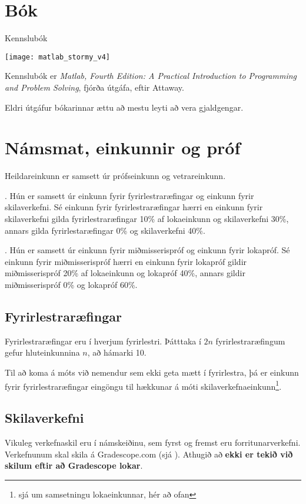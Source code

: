 \documentclass[justified, nobib]{tufte-handout}
\begin{document}
\section{Bók}
\begin{marginfigure}
    \caption{Kennslubók}
    \begin{center}
    \texttt{[image: matlab\_stormy\_v4]}
    \end{center}
\end{marginfigure}
Kennslubók er \emph{Matlab, Fourth Edition: A Practical Introduction to Programming and Problem Solving}, fjórða útgáfa, eftir Attaway.

Eldri útgáfur bókarinnar ættu að mestu leyti að vera gjaldgengar.

\section{Námsmat, einkunnir og próf}
Heildareinkunn er samsett úr prófseinkunn og vetrareinkunn.

. Hún er samsett úr einkunn fyrir fyrirlestraræfingar og einkunn fyrir skilaverkefni. Sé einkunn fyrir fyrirlestraræfingar hærri en einkunn fyrir skilaverkefni gilda fyrirlestraræfingar 10\% af lokaeinkunn og skilaverkefni 30\%, annars gilda fyrirlestaræfingar 0\% og skilaverkefni 40\%.

. Hún er samsett úr einkunn fyrir miðmisserispróf og einkunn fyrir lokapróf. Sé einkunn fyrir miðmisserispróf hærri en einkunn fyrir lokapróf gildir miðmisserispróf 20\% af lokaeinkunn og lokapróf 40\%, annars gildir miðmisserispróf 0\% og lokapróf 60\%.
\subsection{Fyrirlestraræfingar}
\label{sec:lecture-exercises}
Fyrirlestraræfingar eru í hverjum fyrirlestri. Þátttaka í $2n$ fyrirlestraræfingum gefur hluteinkunnina $n$, að hámarki 10.

Til að koma á móts við nemendur sem ekki geta mætt í fyrirlestra, þá er einkunn fyrir fyrirlestraræfingar eingöngu til hækkunar á móti skilaverkefnaeinkunn\footnote{sjá um samsetningu lokaeinkunnar, hér að ofan}.
\subsection{Skilaverkefni}
Vikuleg verkefnaskil eru í námskeiðinu, sem fyrst og fremst eru forritunarverkefni. Verkefnunum skal skila á Gradescope.com (sjá ). Athugið að \textbf{ekki er tekið við skilum eftir að Gradescope lokar}.
\end{document}
